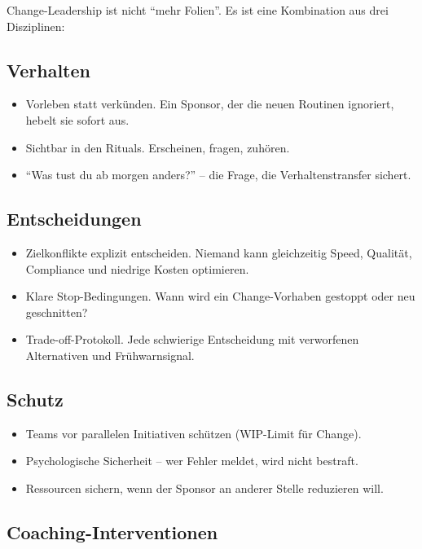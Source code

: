 \documentclass[11pt,a4paper,oneside]{article}
\begin{document}
Change-Leadership ist nicht ``mehr Folien''. Es ist eine Kombination aus drei Disziplinen:

\subsection{Verhalten}

\begin{itemize}
  \item Vorleben statt verkünden. Ein Sponsor, der die neuen Routinen ignoriert, hebelt sie sofort aus.
  \item Sichtbar in den Rituals. Erscheinen, fragen, zuhören.
  \item ``Was tust du ab morgen anders?'' -- die Frage, die Verhaltenstransfer sichert.
\end{itemize}

\subsection{Entscheidungen}

\begin{itemize}
  \item Zielkonflikte explizit entscheiden. Niemand kann gleichzeitig Speed, Qualität, Compliance und niedrige Kosten optimieren.
  \item Klare Stop-Bedingungen. Wann wird ein Change-Vorhaben gestoppt oder neu geschnitten?
  \item Trade-off-Protokoll. Jede schwierige Entscheidung mit verworfenen Alternativen und Frühwarnsignal.
\end{itemize}

\subsection{Schutz}

\begin{itemize}
  \item Teams vor parallelen Initiativen schützen (WIP-Limit für Change).
  \item Psychologische Sicherheit -- wer Fehler meldet, wird nicht bestraft.
  \item Ressourcen sichern, wenn der Sponsor an anderer Stelle reduzieren will.
\end{itemize}

\subsection{Coaching-Interventionen}
\end{document}
